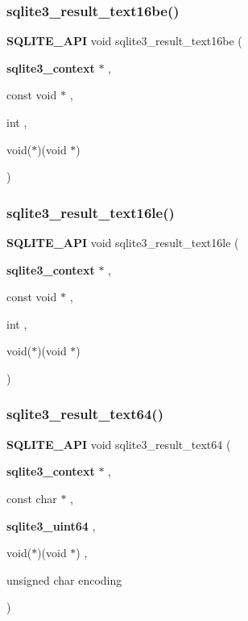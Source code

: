 \mbox{\label{sqlite3_8h_a2d7956a1e23f09dd309c3f08539b6361}} 
\subsubsection{sqlite3\_result\_text16be()}
{\footnotesize\ttfamily \textbf{ S\+Q\+L\+I\+T\+E\+\_\+\+A\+PI} void sqlite3\+\_\+result\+\_\+text16be (\begin{DoxyParamCaption}\item[{\textbf{ sqlite3\+\_\+context} $\ast$}]{,  }\item[{const void $\ast$}]{,  }\item[{int}]{,  }\item[{void($\ast$)(void $\ast$)}]{ }\end{DoxyParamCaption})}

\mbox{\label{sqlite3_8h_ae5cc54e4d40fcfad204fa09323a3cd20}} 
\subsubsection{sqlite3\_result\_text16le()}
{\footnotesize\ttfamily \textbf{ S\+Q\+L\+I\+T\+E\+\_\+\+A\+PI} void sqlite3\+\_\+result\+\_\+text16le (\begin{DoxyParamCaption}\item[{\textbf{ sqlite3\+\_\+context} $\ast$}]{,  }\item[{const void $\ast$}]{,  }\item[{int}]{,  }\item[{void($\ast$)(void $\ast$)}]{ }\end{DoxyParamCaption})}

\mbox{\label{sqlite3_8h_affa34bce1f22b7acb9e5b4ade4e09ee1}} 
\subsubsection{sqlite3\_result\_text64()}
{\footnotesize\ttfamily \textbf{ S\+Q\+L\+I\+T\+E\+\_\+\+A\+PI} void sqlite3\+\_\+result\+\_\+text64 (\begin{DoxyParamCaption}\item[{\textbf{ sqlite3\+\_\+context} $\ast$}]{,  }\item[{const char $\ast$}]{,  }\item[{\textbf{ sqlite3\+\_\+uint64}}]{,  }\item[{void($\ast$)(void $\ast$)}]{,  }\item[{unsigned char}]{encoding }\end{DoxyParamCaption})}

